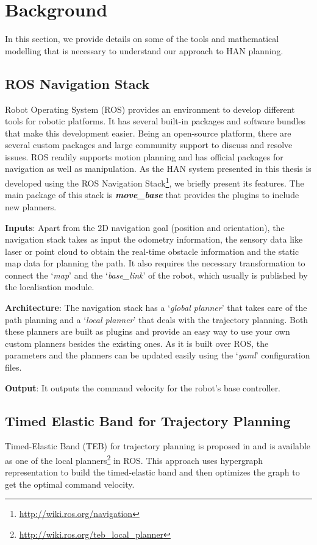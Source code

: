 \section{Background}
In this section, we provide details on some of the tools and mathematical modelling that is necessary to understand our approach to HAN planning.  

\subsection{ROS Navigation Stack}
Robot Operating System (ROS) \cite{quigley2009ros} provides an environment to develop different tools for robotic platforms. It has several built-in packages and software bundles that make this development easier. Being an open-source platform, there are several custom packages and large community support to discuss and resolve issues. ROS readily supports motion planning and has official packages for navigation as well as manipulation. As the HAN system presented in this thesis is developed using the ROS Navigation Stack\footnote{\url{http://wiki.ros.org/navigation}}, we briefly present its features. The main package of this stack is \textit{\textbf{move\_base}} that provides the plugins to include new planners.

\textbf{Inputs}: Apart from the 2D navigation goal (position and orientation), the navigation stack takes as input the odometry information, the sensory data like laser or point cloud to obtain the real-time obstacle information and the static map data for planning the path. It also requires the necessary transformation to connect the `\textit{map}' and the `\textit{base\_link}' of the robot, which usually is published by the localisation module.

\textbf{Architecture}: The navigation stack has a `\textit{global planner}' that takes care of the path planning and a `\textit{local planner}' that deals with the trajectory planning. Both these planners are built as plugins and provide an easy way to use your own custom planners besides the existing ones. As it is built over ROS, the parameters and the planners can be updated easily using the `\textit{yaml}' configuration files. 

\textbf{Output}: It outputs the command velocity for the robot's base controller.

\subsection{Timed Elastic Band for Trajectory Planning}
Timed-Elastic Band (TEB) for trajectory planning is proposed in \cite{rosmann2013efficient} and is available as one of the local planners\footnote{\url{http://wiki.ros.org/teb_local_planner}} in ROS. This approach uses hypergraph representation to build the timed-elastic band and then optimizes the graph to get the optimal command velocity.
